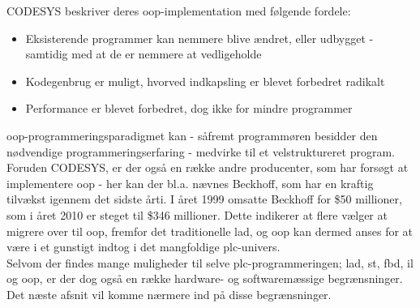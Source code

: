 
\noindent CODESYS beskriver deres \gls{oop}-implementation med følgende fordele\cite{codesys-oop-benefits}:
\begin{itemize}
\item Eksisterende programmer kan nemmere blive ændret, eller udbygget - samtidig med at de er nemmere at vedligeholde
\item Kodegenbrug er muligt, hvorved indkapsling er blevet forbedret radikalt
\item Performance er blevet forbedret, dog ikke for mindre programmer
\end{itemize}

\noindent\gls{oop}-programmeringsparadigmet kan - såfremt programmøren besidder den nødvendige programmeringserfaring - medvirke til et velstruktureret program. Foruden CODESYS, er der også en række andre producenter, som har forsøgt at implementere \gls{oop} - her kan der bl.a. nævnes Beckhoff, som har en kraftig tilvækst igennem det sidste årti. I året 1999 omsatte Beckhoff for \$50 millioner, som i året 2010 er steget til \$346 millioner. Dette indikerer at flere vælger at migrere over til \gls{oop}, fremfor det traditionelle \gls{lad}, og \gls{oop} kan dermed anses for at være i et gunstigt indtog i det mangfoldige \gls{plc}-univers\cite{beckhoff-sold}. \\

\noindent Selvom der findes mange muligheder til selve \gls{plc}-programmeringen; \gls{lad}, \gls{st}, \gls{fbd}, \gls{il} og \gls{oop}, er der dog også en række hardware- og softwaremæssige begrænsninger. Det næste afsnit vil komme nærmere ind på disse begrænsninger.

